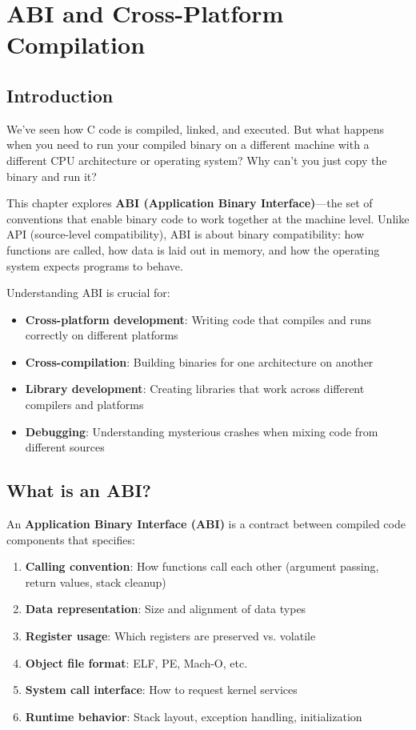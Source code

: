 \chapter{ABI and Cross-Platform Compilation}

\section{Introduction}

We've seen how C code is compiled, linked, and executed. But what happens when you need to run your compiled binary on a different machine with a different CPU architecture or operating system? Why can't you just copy the binary and run it?

This chapter explores \textbf{ABI (Application Binary Interface)}—the set of conventions that enable binary code to work together at the machine level. Unlike API (source-level compatibility), ABI is about binary compatibility: how functions are called, how data is laid out in memory, and how the operating system expects programs to behave.

Understanding ABI is crucial for:
\begin{itemize}
    \item \textbf{Cross-platform development}: Writing code that compiles and runs correctly on different platforms
    \item \textbf{Cross-compilation}: Building binaries for one architecture on another
    \item \textbf{Library development}: Creating libraries that work across different compilers and platforms
    \item \textbf{Debugging}: Understanding mysterious crashes when mixing code from different sources
\end{itemize}

\section{What is an ABI?}

An \textbf{Application Binary Interface (ABI)} is a contract between compiled code components that specifies:

\begin{enumerate}
    \item \textbf{Calling convention}: How functions call each other (argument passing, return values, stack cleanup)
    \item \textbf{Data representation}: Size and alignment of data types
    \item \textbf{Register usage}: Which registers are preserved vs. volatile
    \item \textbf{Object file format}: ELF, PE, Mach-O, etc.
    \item \textbf{System call interface}: How to request kernel services
    \item \textbf{Runtime behavior}: Stack layout, exception handling, initialization
\end{enumerate}

